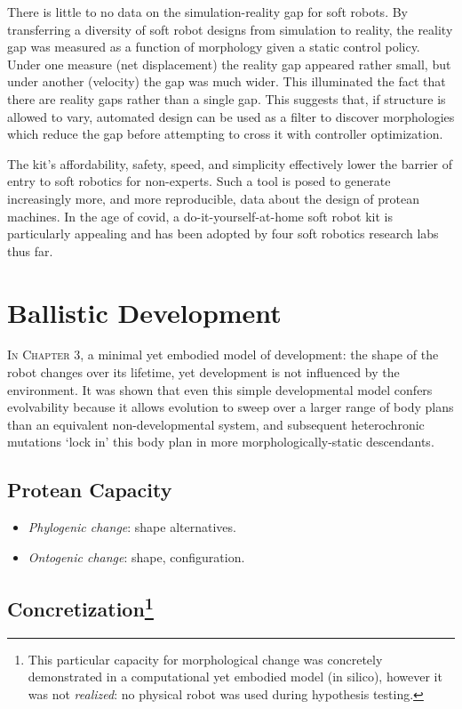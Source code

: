 There is little to no data on the simulation-reality gap for soft robots.
By transferring a diversity of soft robot designs from simulation to reality, the reality gap was measured as a function of morphology given a static control policy.
Under one measure (net displacement) the reality gap appeared rather small, but under another (velocity) the gap was much wider.
This illuminated the fact that there are reality gaps rather than a single gap.
This suggests that, if structure is allowed to vary, automated design can be used as a filter to discover morphologies which reduce the gap before attempting to cross it with controller optimization.

The kit's affordability, safety, speed, and simplicity effectively lower the barrier of entry to soft robotics for non-experts.
Such a tool is posed to generate increasingly more, and more reproducible, data about the design of protean machines.
In the age of covid, a do-it-yourself-at-home soft robot kit 
is particularly appealing and has been adopted by four soft robotics research labs thus far.



\section{Ballistic Development}


\textsc{In Chapter 3,}
a minimal yet embodied model of development: 
the shape of the
robot changes over its lifetime, yet development is not influenced
by the environment. 
It was shown that even this simple developmental
model confers evolvability because it allows evolution to sweep over a larger range of body plans than an equivalent non-developmental system, and subsequent heterochronic mutations
`lock in' this body plan in more morphologically-static descendants.


\subsection{Protean Capacity}

\begin{itemize}
    \item \textit{Phylogenic change}: shape alternatives.
    \item \textit{Ontogenic change}: shape, configuration.
\end{itemize}


\subsection[Concretization]{Concretization\footnote{This particular capacity for morphological change was concretely demonstrated in a computational yet embodied model (in silico), however it was not \textit{realized}: no physical robot was used during hypothesis testing.}}

